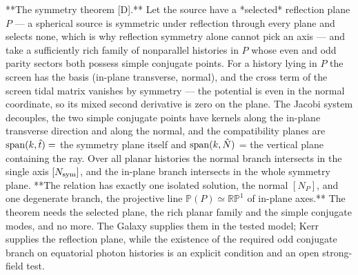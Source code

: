 **The symmetry theorem [D].** Let the source have a *selected* reflection plane $P$ — a spherical source is symmetric under reflection through every plane and selects none, which is why reflection symmetry alone cannot pick an axis — and take a sufficiently rich family of nonparallel histories in $P$ whose even and odd parity sectors both possess simple conjugate points. For a history lying in $P$ the screen has the basis (in-plane transverse, normal), and the cross term of the screen tidal matrix vanishes by symmetry — the potential is even in the normal coordinate, so its mixed second derivative is zero on the plane. The Jacobi system decouples, the two simple conjugate points have kernels along the in-plane transverse direction and along the normal, and the compatibility planes are ${\rm span}(k,\hat t) =$ the symmetry plane itself and ${\rm span}(k,\hat N)$ = the vertical plane containing the ray. Over all planar histories the normal branch intersects in the single axis $[N_{\rm sym}]$, and the in-plane branch intersects in the whole symmetry plane. **The relation has exactly one isolated solution, the normal $[N_P]$, and one degenerate branch, the projective line $\mathbb P(P)\simeq\mathbb{RP}^1$ of in-plane axes.** The theorem needs the selected plane, the rich planar family and the simple conjugate modes, and no more. The Galaxy supplies them in the tested model; Kerr supplies the reflection plane, while the existence of the required odd conjugate branch on equatorial photon histories is an explicit condition and an open strong-field test.

